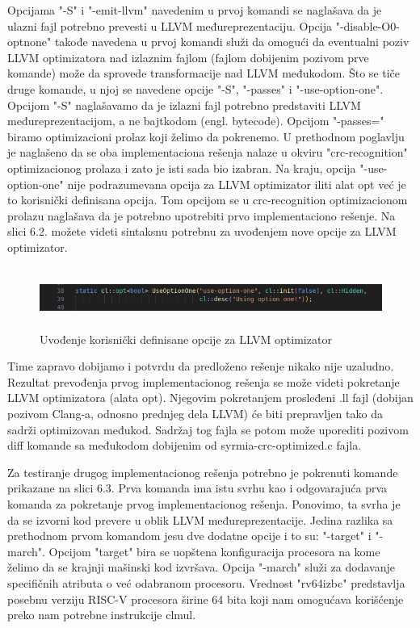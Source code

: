 \documentclass[12pt,oneside]{memoir}
\begin{document}
Opcijama "-S" i "-emit-llvm" navedenim u prvoj komandi se naglašava da je ulazni fajl potrebno 
prevesti u LLVM međureprezentaciju. Opcija "-disable-O0-optnone" takođe navedena u prvoj komandi 
služi da omogući da eventualni poziv LLVM optimizatora nad izlaznim fajlom (fajlom dobijenim 
pozivom prve komande) može da sprovede transformacije nad LLVM međukodom. Što se tiče druge 
komande, u njoj se navedene opcije "-S", "-passes" i "-use-option-one". Opcijom "-S" naglašavamo 
da je izlazni fajl potrebno predstaviti LLVM međureprezentacijom, a ne bajtkodom (engl. 
bytecode). Opcijom "-passes=" biramo optimizacioni prolaz koji želimo da pokrenemo. U prethodnom 
poglavlju je naglašeno da se oba implementaciona rešenja nalaze u okviru "crc-recognition" 
optimizacionog prolaza i zato je isti sada bio izabran. Na kraju, opcija "-use-option-one" nije 
podrazumevana opcija za LLVM optimizator iliti alat opt već je to korisnički definisana opcija. 
Tom opcijom se u crc-recognition optimizacionom prolazu naglašava da je potrebno upotrebiti prvo 
implementaciono rešenje. Na slici 6.2. možete videti sintaksnu potrebnu za uvođenjem nove opcije za LLVM optimizator.

\begin{figure}
\includegraphics[width=\textwidth, height=2cm]{use_option_one}
\caption{Uvođenje korisnički definisane opcije za LLVM optimizator}
\end{figure}

Time zapravo dobijamo i potvrdu da predloženo rešenje nikako nije uzaludno.
Rezultat prevođenja prvog implementacionog rešenja se može videti pokretanje LLVM optimizatora 
(alata opt). Njegovim pokretanjem prosleđeni .ll fajl (dobijan pozivom Clang-a, odnosno prednjeg 
dela LLVM) će biti prepravljen tako da sadrži optimizovan međukod. Sadržaj tog fajla se potom 
može uporediti pozivom diff komande sa međukodom dobijenim od syrmia-crc-optimized.c fajla.

Za testiranje drugog implementacionog rešenja potrebno je pokrenuti komande prikazane na slici 
6.3. Prva komanda ima istu svrhu kao i odgovarajuća prva komanda za pokretanje prvog 
implementacionog rešenja. Ponovimo, ta svrha je da se izvorni kod prevere u oblik LLVM 
međureprezentacije. Jedina razlika sa prethodnom prvom komandom jesu dve dodatne opcije i to su: 
"-target" i "-march". Opcijom "target" bira se uopštena konfiguracija procesora na kome želimo da 
se krajnji mašinski kod izvršava. Opcija "-march" služi za dodavanje specifičnih atributa o već 
odabranom procesoru. Vrednost "rv64izbc" predstavlja posebnu verziju RISC-V procesora širine 64 bita koji nam omogućava korišćenje preko nam potrebne instrukcije clmul.
\end{document}
